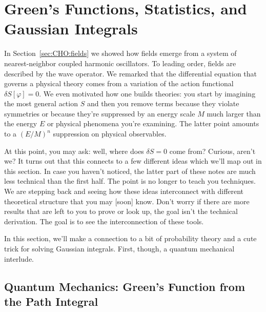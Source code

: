\chapter{Green's Functions, Statistics, and Gaussian Integrals}

In Section~\ref{sec:CHO:fields} we showed how fields emerge from a system of nearest-neighbor coupled harmonic oscillators. To leading order, fields are described by the wave operator. We remarked that the differential equation that governs a physical theory comes from a variation of the action functional $\delta S[\varphi]=0$. We even motivated how one builds theories: you start by imagining the most general action $S$ and then you remove terms because they violate symmetries or because they're suppressed by an energy scale $M$ much larger than the energy $E$ or physical phenomena you're examining. The latter point amounts to a $(E/M)^n$ suppression on physical observables. 

At this point, you may ask: well, where does $\delta S = 0$ come from? Curious, aren't we? It turns out that this connects to a few different ideas which we'll map out in this section. In case you haven't noticed, the latter part of these notes are much less technical than the first half. The point is no longer to teach you techniques. We are stepping back and seeing how these ideas interconnect with different theoretical structure that you may [soon] know. Don't worry if there are more results that are left to you to prove or look up, the goal isn't the technical derivation. The goal is to see the interconnection of these tools.

In this section, we'll make a connection to a bit of probability theory and a cute trick for solving Gaussian integrals. First, though, a quantum mechanical interlude.

\section{Quantum Mechanics: Green's Function from the Path Integral}


